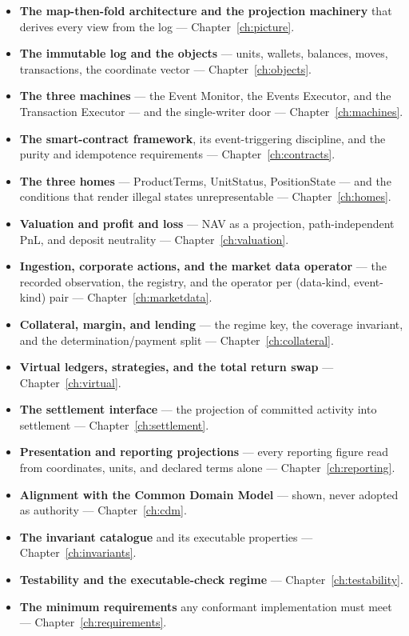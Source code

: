 \documentclass[11pt,a4paper]{article}
\begin{document}
\begin{itemize}[leftmargin=*, itemsep=2.5pt]
\item \textbf{The map-then-fold architecture and the projection machinery} that derives
  every view from the log --- Chapter~\ref{ch:picture}.
\item \textbf{The immutable log and the objects} --- units, wallets, balances, moves,
  transactions, the coordinate vector --- Chapter~\ref{ch:objects}.
\item \textbf{The three machines} --- the Event Monitor, the Events Executor, and the
  Transaction Executor --- and the single-writer door --- Chapter~\ref{ch:machines}.
\item \textbf{The smart-contract framework}, its event-triggering discipline, and the
  purity and idempotence requirements --- Chapter~\ref{ch:contracts}.
\item \textbf{The three homes} --- ProductTerms, UnitStatus, PositionState --- and the
  conditions that render illegal states unrepresentable --- Chapter~\ref{ch:homes}.
\item \textbf{Valuation and profit and loss} --- NAV as a projection, path-independent PnL,
  and deposit neutrality --- Chapter~\ref{ch:valuation}.
\item \textbf{Ingestion, corporate actions, and the market data operator} --- the recorded
  observation, the registry, and the operator per (data-kind, event-kind) pair ---
  Chapter~\ref{ch:marketdata}.
\item \textbf{Collateral, margin, and lending} --- the regime key, the coverage invariant,
  and the determination/payment split --- Chapter~\ref{ch:collateral}.
\item \textbf{Virtual ledgers, strategies, and the total return swap} ---
  Chapter~\ref{ch:virtual}.
\item \textbf{The settlement interface} --- the projection of committed activity into
  settlement --- Chapter~\ref{ch:settlement}.
\item \textbf{Presentation and reporting projections} --- every reporting figure read from
  coordinates, units, and declared terms alone --- Chapter~\ref{ch:reporting}.
\item \textbf{Alignment with the Common Domain Model} --- shown, never adopted as authority
  --- Chapter~\ref{ch:cdm}.
\item \textbf{The invariant catalogue} and its executable properties ---
  Chapter~\ref{ch:invariants}.
\item \textbf{Testability and the executable-check regime} ---
  Chapter~\ref{ch:testability}.
\item \textbf{The minimum requirements} any conformant implementation must meet ---
  Chapter~\ref{ch:requirements}.
\end{itemize}
\end{document}
